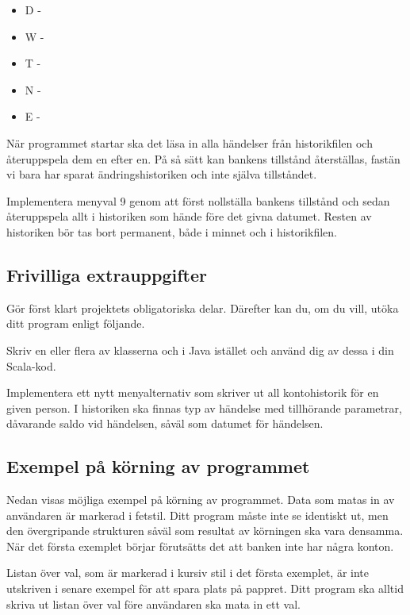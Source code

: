 \begin{itemize}
\item D - 
\item W - 
\item T - 
\item N - 
\item E - 
\end{itemize}

\Subtask När programmet startar ska det läsa in alla händelser från historikfilen och återuppspela dem en efter en. På så sätt kan bankens tillstånd återställas, fastän vi bara har sparat ändringshistoriken och inte själva tillståndet.

\Task Implementera menyval 9 genom att först nollställa bankens tillstånd och sedan återuppspela allt i historiken som hände före det givna datumet. Resten av historiken bör tas bort permanent, både i minnet och i historikfilen.


\subsection{Frivilliga extrauppgifter}

Gör först klart projektets obligatoriska delar. Därefter kan du, om du vill, utöka ditt program enligt följande.

\Task Skriv en eller flera av klasserna  och  i Java istället och använd dig av dessa i din Scala-kod.

\Task	Implementera ett nytt menyalternativ som skriver ut all kontohistorik för en given person. I historiken ska finnas typ av händelse med tillhörande parametrar, dåvarande saldo vid händelsen, såväl som datumet för händelsen.

\subsection{Exempel på körning av programmet}

Nedan visas möjliga exempel på körning av programmet. Data som matas in av användaren är markerad i fetstil.
Ditt program måste inte se identiskt ut, men den övergripande strukturen såväl som resultat av körningen ska vara densamma.
När det första exemplet börjar förutsätts det att banken inte har några konton.

Listan över val, som är markerad i kursiv stil i det första exemplet, är inte utskriven i senare exempel för att spara plats på pappret. Ditt program ska alltid skriva ut listan över val före användaren ska mata in ett val.

